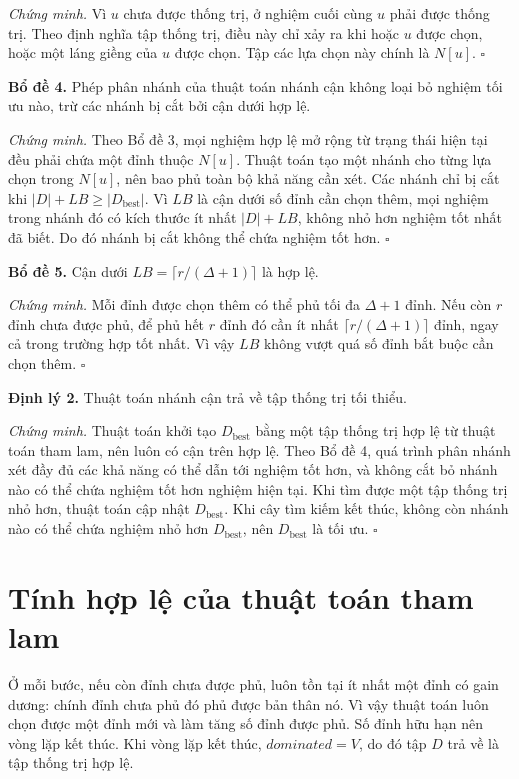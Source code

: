 \documentclass[12pt, a4paper]{report}
\begin{document}
\textit{Chứng minh.} Vì $u$ chưa được thống trị, ở nghiệm cuối cùng $u$ phải được thống trị. Theo định
nghĩa tập thống trị, điều này chỉ xảy ra khi hoặc $u$ được chọn, hoặc một láng giềng của $u$ được chọn.
Tập các lựa chọn này chính là $N[u]$. \hfill $\square$

\textbf{Bổ đề 4.} Phép phân nhánh của thuật toán nhánh cận không loại bỏ nghiệm tối ưu nào, trừ các nhánh
bị cắt bởi cận dưới hợp lệ.

\textit{Chứng minh.} Theo Bổ đề 3, mọi nghiệm hợp lệ mở rộng từ trạng thái hiện tại đều phải chứa một
đỉnh thuộc $N[u]$. Thuật toán tạo một nhánh cho từng lựa chọn trong $N[u]$, nên bao phủ toàn bộ khả năng
cần xét. Các nhánh chỉ bị cắt khi $|D|+LB \geq |D_{\mathrm{best}}|$. Vì $LB$ là cận dưới số đỉnh cần chọn
thêm, mọi nghiệm trong nhánh đó có kích thước ít nhất $|D|+LB$, không nhỏ hơn nghiệm tốt nhất đã biết.
Do đó nhánh bị cắt không thể chứa nghiệm tốt hơn. \hfill $\square$

\textbf{Bổ đề 5.} Cận dưới $LB=\lceil r/(\Delta+1)\rceil$ là hợp lệ.

\textit{Chứng minh.} Mỗi đỉnh được chọn thêm có thể phủ tối đa $\Delta+1$ đỉnh. Nếu còn $r$ đỉnh chưa
được phủ, để phủ hết $r$ đỉnh đó cần ít nhất $\lceil r/(\Delta+1)\rceil$ đỉnh, ngay cả trong trường hợp
tốt nhất. Vì vậy $LB$ không vượt quá số đỉnh bắt buộc cần chọn thêm. \hfill $\square$

\textbf{Định lý 2.} Thuật toán nhánh cận trả về tập thống trị tối thiểu.

\textit{Chứng minh.} Thuật toán khởi tạo $D_{\mathrm{best}}$ bằng một tập thống trị hợp lệ từ thuật toán
tham lam, nên luôn có cận trên hợp lệ. Theo Bổ đề 4, quá trình phân nhánh xét đầy đủ các khả năng có thể
dẫn tới nghiệm tốt hơn, và không cắt bỏ nhánh nào có thể chứa nghiệm tốt hơn nghiệm hiện tại. Khi tìm
được một tập thống trị nhỏ hơn, thuật toán cập nhật $D_{\mathrm{best}}$. Khi cây tìm kiếm kết thúc, không
còn nhánh nào có thể chứa nghiệm nhỏ hơn $D_{\mathrm{best}}$, nên $D_{\mathrm{best}}$ là tối ưu. \hfill $\square$

\section{Tính hợp lệ của thuật toán tham lam}

Ở mỗi bước, nếu còn đỉnh chưa được phủ, luôn tồn tại ít nhất một đỉnh có gain dương: chính đỉnh chưa phủ
đó phủ được bản thân nó. Vì vậy thuật toán luôn chọn được một đỉnh mới và làm tăng số đỉnh được phủ.
Số đỉnh hữu hạn nên vòng lặp kết thúc. Khi vòng lặp kết thúc, $dominated=V$, do đó tập $D$ trả về là
tập thống trị hợp lệ.
\end{document}
